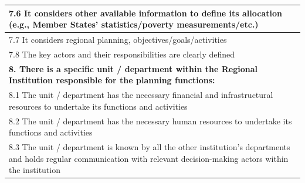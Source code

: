 \documentclass[
  10pt,
]{book}
\begin{document}
\begin{table}
\begin{tabular}[t]{l}
\hline
\hspace{1em}7.6 It considers other available information to define its allocation (e.g., Member States’ statistics/poverty measurements/etc.)\\
\hline
\hspace{1em}7.7 It considers regional planning, objectives/goals/activities\\
\hline
\hspace{1em}7.8 The key actors and their responsibilities are clearly defined\\
\hline
\multicolumn{1}{l}{\textbf{8. There is a specific unit / department within the Regional Institution responsible for the planning functions:}}\\
\hline
\hspace{1em}8.1 The unit / department has the necessary financial and infrastructural resources to undertake its functions and activities\\
\hline
\hspace{1em}8.2 The unit / department has the necessary human resources to undertake its functions and activities\\
\hline
\hspace{1em}8.3 The unit / department is known by all the other institution's departments and holds regular communication with relevant decision-making actors within the institution\\
\hline
\end{tabular}
\end{table}
\end{document}
